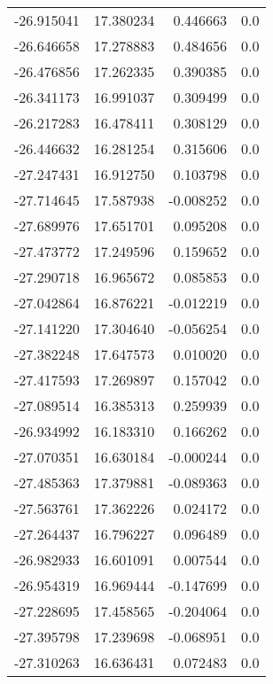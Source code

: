 \begin{tabular}{rrrr}
      -26.915041 &        17.380234 &    0.446663 &   0.0 \\
      -26.646658 &        17.278883 &    0.484656 &   0.0 \\
      -26.476856 &        17.262335 &    0.390385 &   0.0 \\
      -26.341173 &        16.991037 &    0.309499 &   0.0 \\
      -26.217283 &        16.478411 &    0.308129 &   0.0 \\
      -26.446632 &        16.281254 &    0.315606 &   0.0 \\
      -27.247431 &        16.912750 &    0.103798 &   0.0 \\
      -27.714645 &        17.587938 &   -0.008252 &   0.0 \\
      -27.689976 &        17.651701 &    0.095208 &   0.0 \\
      -27.473772 &        17.249596 &    0.159652 &   0.0 \\
      -27.290718 &        16.965672 &    0.085853 &   0.0 \\
      -27.042864 &        16.876221 &   -0.012219 &   0.0 \\
      -27.141220 &        17.304640 &   -0.056254 &   0.0 \\
      -27.382248 &        17.647573 &    0.010020 &   0.0 \\
      -27.417593 &        17.269897 &    0.157042 &   0.0 \\
      -27.089514 &        16.385313 &    0.259939 &   0.0 \\
      -26.934992 &        16.183310 &    0.166262 &   0.0 \\
      -27.070351 &        16.630184 &   -0.000244 &   0.0 \\
      -27.485363 &        17.379881 &   -0.089363 &   0.0 \\
      -27.563761 &        17.362226 &    0.024172 &   0.0 \\
      -27.264437 &        16.796227 &    0.096489 &   0.0 \\
      -26.982933 &        16.601091 &    0.007544 &   0.0 \\
      -26.954319 &        16.969444 &   -0.147699 &   0.0 \\
      -27.228695 &        17.458565 &   -0.204064 &   0.0 \\
      -27.395798 &        17.239698 &   -0.068951 &   0.0 \\
      -27.310263 &        16.636431 &    0.072483 &   0.0 \\

\end{tabular}
